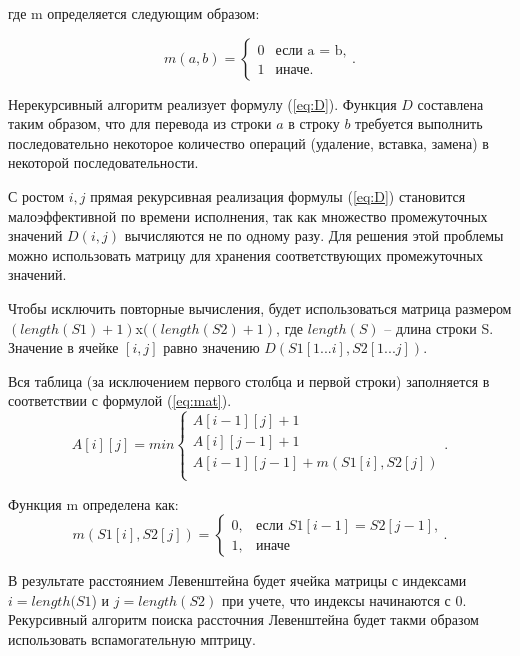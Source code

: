 где m определяется следующим образом:

\begin{equation}
	\label{eq:m}
	m(a, b) = \begin{cases}
		0 &\text{если a = b,}\\
		1 &\text{иначе.}
	\end{cases}.
\end{equation}

Нерекурсивный алгоритм реализует формулу (\ref{eq:D}).
Функция $D$ составлена таким образом, что для перевода из строки $a$ в строку $b$ требуется выполнить последовательно некоторое количество операций (удаление, вставка, замена) в некоторой последовательности. 

С ростом $i, j$ прямая рекурсивная реализация формулы (\ref{eq:D}) становится малоэффективной по времени исполнения, так как множество промежуточных значений $ D(i, j)$ вычисляются не по одному разу. Для решения этой проблемы можно использовать матрицу для хранения соответствующих промежуточных значений.

Чтобы исключить повторные вычисления, будет использоваться матрица размером $(length(S1)+ 1)$x$((length(S2) + 1)$, где $length(S)$ -- длина строки S. Значение в ячейке $[i, j]$ равно значению $D(S1[1...i], S2[1...j])$.

Вся таблица (за исключением первого столбца и первой строки) заполняется в соответствии с формулой (\ref{eq:mat}).
\begin{equation}
	\label{eq:mat}
	A[i][j] = min \begin{cases}
		A[i-1][j] + 1\\
		 A[i][j-1] + 1\\
		 A[i-1][j-1] + m(S1[i], S2[j])\\
	 \end{cases}.
 \end{equation}

Функция m определена как:
\begin{equation}
\label{eq:m2}
m(S1[i], S2[j]) = \begin{cases}
0, &\text{если $S1[i - 1] = S2[j - 1]$,}\\
1, &\text{иначе}
\end{cases}.
\end{equation}
 
В результате расстоянием Левенштейна будет ячейка матрицы с индексами $i = length(S1$) и $j = length(S2)$ при учете, что индексы начинаются с 0. Рекурсивный алгоритм поиска рассточния Левенштейна будет такми образом использовать вспамогательную мптрицу.


